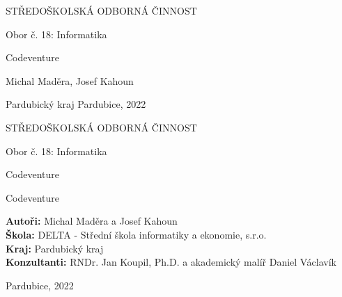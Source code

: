 \begin{titlepage}
    \bfseries{
        \begin{center}
            \LARGE{STŘEDOŠKOLSKÁ ODBORNÁ ČINNOST}

            \vspace{14pt}
            \large{
                Obor č. 18: Informatika
            }

            \vspace{0.35 \textheight}

            \LARGE{
			Codeventure
            }

            \vspace{0.35\textheight}
        \end{center}
        
        \noindent\Large{Michal Maděra, Josef Kahoun}

        \noindent\Large{Pardubický kraj   Pardubice, 2022}
        
            
    }
\end{titlepage}

\cleardoublepage

{\bfseries
    \begin{center}
        \LARGE{STŘEDOŠKOLSKÁ ODBORNÁ ČINNOST}

        \vspace{14pt}
        {\large
            Obor č. 18: Informatika
        }

        \vspace{0.3 \textheight}

        \LARGE{
        Codeventure
        }

        \LARGE{
        Codeventure
        }

        \vspace{0.24\textheight}
    \end{center}  
}
{\Large
    \noindent\textbf{Autoři:} Michal Maděra a Josef Kahoun\\
    \textbf{Škola:} DELTA - Střední škola informatiky a ekonomie, s.r.o.\\
    \textbf{Kraj:} Pardubický kraj\\
    \textbf{Konzultanti:} RNDr. Jan Koupil, Ph.D. a akademický malíř Daniel Václavík\\
}

\noindent Pardubice, 2022

\cleardoublepage

